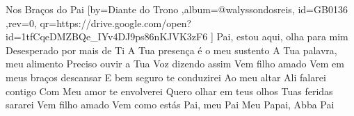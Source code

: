 \beginsong
{Nos Braços do Pai %
}[by={Diante do Trono %
},album={@walyssondosreis},
id={GB0136 %
},rev={0}, %
qr={https://drive.google.com/open?id=1tfCqeDMZBQe_IYv4DJ9ps86nKJVK3zF6 %
}]
\beginverse*
Pai, estou aqui, olha para mim
Desesperado por mais de Ti
\endverse
\beginverse*
A Tua presença é o meu sustento
A Tua palavra, meu alimento
Preciso ouvir a Tua Voz dizendo assim
\endverse
\beginchorus
Vem filho amado
Vem em meus braços descansar
E bem seguro te conduzirei
Ao meu altar
Ali falarei contigo
Com Meu amor te envolverei
Quero olhar em teus olhos
Tuas feridas sararei
Vem filho amado
Vem como estás
\endchorus
\beginverse*
Pai, meu Pai
Meu Papai, Abba Pai
\endverse
\vspace{4em} %
\begin{comment}
\lstset{basicstyle=\scriptsize\bf} %
\tab{Solo 1}
\begin{lstlisting}
E|-----------------------------------------------------|
B|-----------------------------------------------------|
G|-----------------------------------------------------|
D|-----------------------------------------------------|
A|-----------------------------------------------------|
E|-----------------------------------------------------|
\end{lstlisting}
\end{comment}
 
